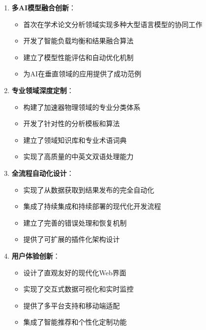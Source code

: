 \documentclass[12pt,a4paper]{article}
\begin{document}
\begin{enumerate}
    \item \textbf{多AI模型融合创新}：
        \begin{itemize}
            \item 首次在学术论文分析领域实现多种大型语言模型的协同工作
            \item 开发了智能负载均衡和结果融合算法
            \item 建立了模型性能评估和自动优化机制
            \item 为AI在垂直领域的应用提供了成功范例
        \end{itemize}
    
    \item \textbf{专业领域深度定制}：
        \begin{itemize}
            \item 构建了加速器物理领域的专业分类体系
            \item 开发了针对性的分析模板和算法
            \item 建立了领域知识库和专业术语词典
            \item 实现了高质量的中英文双语处理能力
        \end{itemize}
    
    \item \textbf{全流程自动化设计}：
        \begin{itemize}
            \item 实现了从数据获取到结果发布的完全自动化
            \item 集成了持续集成和持续部署的现代化开发流程
            \item 建立了完善的错误处理和恢复机制
            \item 提供了可扩展的插件化架构设计
        \end{itemize}
    
    \item \textbf{用户体验创新}：
        \begin{itemize}
            \item 设计了直观友好的现代化Web界面
            \item 实现了交互式数据可视化和实时监控
            \item 提供了多平台支持和移动端适配
            \item 集成了智能推荐和个性化定制功能
        \end{itemize}
\end{enumerate}
\end{document}
